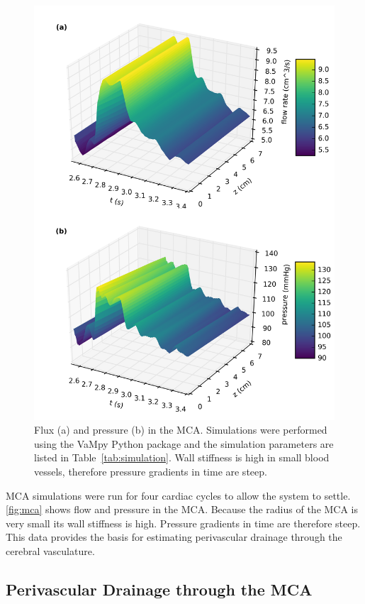 \documentclass[a4paper,titlepage]{scrartcl}
\begin{document}
\begin{figure}
\centerline{\includegraphics{figures/mca.png}}
\caption{Flux (a) and pressure (b) in the MCA. Simulations were performed using the VaMpy Python package \cite{Diem2016a} and the simulation parameters are listed in Table~\ref{tab:simulation}. Wall stiffness is high in small blood vessels, therefore pressure gradients in time are steep.\label{fig:mca}}
\end{figure}

MCA simulations were run for four cardiac cycles to allow the system to settle. \autoref{fig:mca} shows flow and pressure in the MCA. Because the radius of the MCA is very small its wall stiffness is high. Pressure gradients in time are therefore steep. This data provides the basis for estimating perivascular drainage through the cerebral vasculature.


\subsection{Perivascular Drainage through the MCA}
\end{document}
